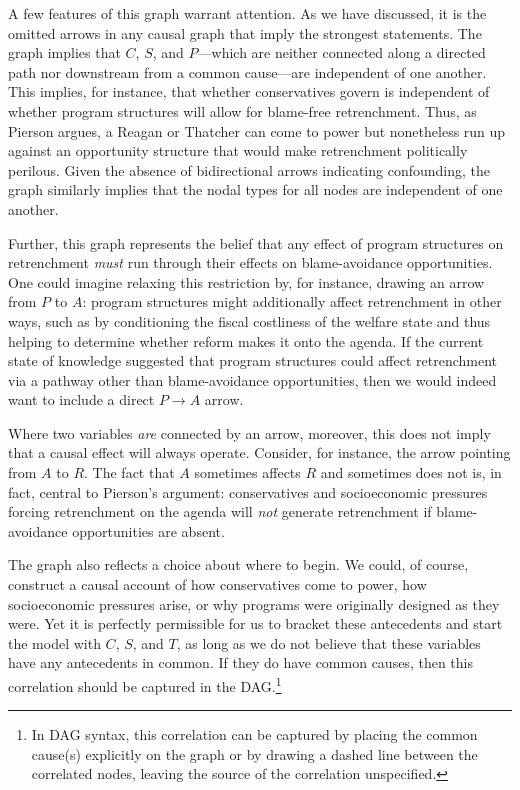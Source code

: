 \documentclass[
  12pt,
]{book}
\begin{document}
A few features of this graph warrant attention. As we have discussed, it is the omitted arrows in any causal graph that imply the strongest statements. The graph implies that \(C\), \(S\), and \(P\)---which are neither connected along a directed path nor downstream from a common cause---are independent of one another. This implies, for instance, that whether conservatives govern is independent of whether program structures will allow for blame-free retrenchment. Thus, as Pierson argues, a Reagan or Thatcher can come to power but nonetheless run up against an opportunity structure that would make retrenchment politically perilous. Given the absence of bidirectional arrows indicating confounding, the graph similarly implies that the nodal types for all nodes are independent of one another.

Further, this graph represents the belief that any effect of program structures on retrenchment \emph{must} run through their effects on blame-avoidance opportunities. One could imagine relaxing this restriction by, for instance, drawing an arrow from \(P\) to \(A\): program structures might additionally affect retrenchment in other ways, such as by conditioning the fiscal costliness of the welfare state and thus helping to determine whether reform makes it onto the agenda. If the current state of knowledge suggested that program structures could affect retrenchment via a pathway other than blame-avoidance opportunities, then we would indeed want to include a direct \(P \rightarrow A\) arrow.

Where two variables \emph{are} connected by an arrow, moreover, this does not imply that a causal effect will always operate. Consider, for instance, the arrow pointing from \(A\) to \(R\). The fact that \(A\) sometimes affects \(R\) and sometimes does not is, in fact, central to Pierson's argument: conservatives and socioeconomic pressures forcing retrenchment on the agenda will \emph{not} generate retrenchment if blame-avoidance opportunities are absent.

The graph also reflects a choice about where to begin. We could, of course, construct a causal account of how conservatives come to power, how socioeconomic pressures arise, or why programs were originally designed as they were. Yet it is perfectly permissible for us to bracket these antecedents and start the model with \(C\), \(S\), and \(T\), as long as we do not believe that these variables have any antecedents in common. If they do have common causes, then this correlation should be captured in the DAG.\footnote{In DAG syntax, this correlation can be captured by placing the common cause(s) explicitly on the graph or by drawing a dashed line between the correlated nodes, leaving the source of the correlation unspecified.}
\end{document}
